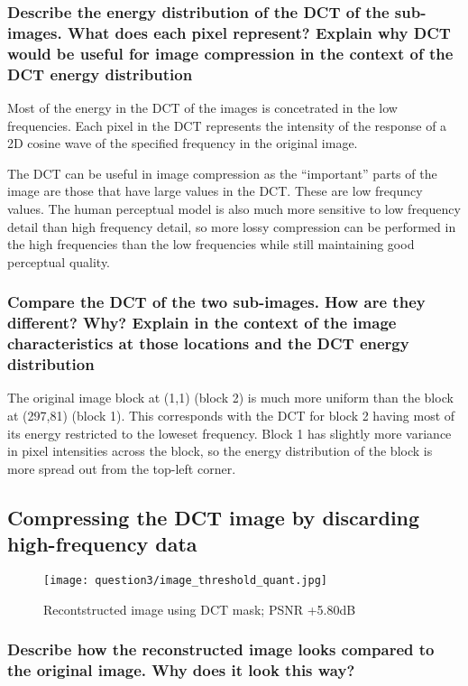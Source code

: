 \subsubsection{Describe the energy distribution of the DCT of the sub-images. What does each pixel represent? Explain why DCT would be useful for image compression in the context of the DCT energy distribution}

Most of the energy in the DCT of the images is concetrated in the low frequencies. Each pixel in the DCT represents the intensity of the response of a 2D cosine wave of the specified frequency in the original image.

The DCT can be useful in image compression as the ``important'' parts of the image are those that have large values in the DCT. These are low frequncy values. The human perceptual model is also much more sensitive to low frequency detail than high frequency detail, so more lossy compression can be performed in the high frequencies than the low frequencies while still maintaining good perceptual quality.

\subsubsection{Compare the DCT of the two sub-images. How are they different? Why? Explain in the context of the image characteristics at those locations and the DCT energy distribution}

The original image block at (1,1) (block 2) is much more uniform than the block at (297,81) (block 1). This corresponds with the DCT for block 2 having most of its energy restricted to the loweset frequency. Block 1 has slightly more variance in pixel intensities across the block, so the energy distribution of the block is more spread out from the top-left corner.

\clearpage
\subsection{Compressing the DCT image by discarding high-frequency data}

\begin{figure}[ht]
	\centering
	\texttt{[image: question3/image\_threshold\_quant.jpg]}
	\caption{Recontstructed image using DCT mask; PSNR +5.80dB}
\end{figure}

\subsubsection{Describe how the reconstructed image looks compared to the original image. Why does it look this way?}

